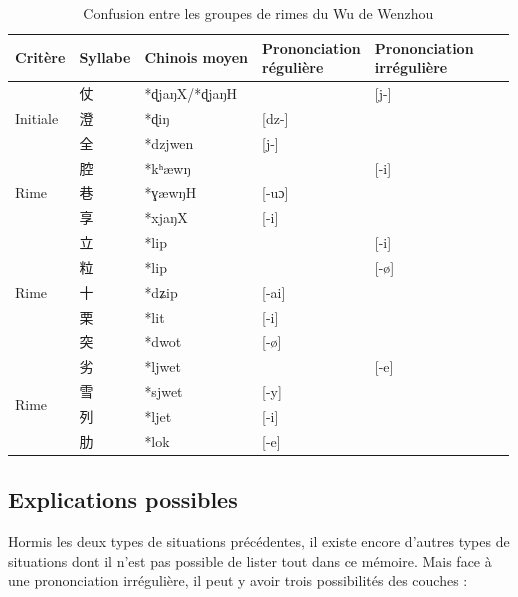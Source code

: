 \documentclass{scrbook}
\newcounter{c}[subsubsection]
\begin{document}
\begin{sloppypar}
\begin{table}[htbp]
\begin{tabular}{lllllll}
    Critère & Syllabe & Chinois moyen  & \makecell{Prononciation\\ régulière} & \makecell{Prononciation\\ irrégulière} \\
    \midrule
    \multirow{3}[2]{*}{Initiale} & \cellcolor[rgb]{ .851,  .851,  .851}仗 & *ɖjaŋX/*ɖjaŋH &       & \multicolumn{1}{l}{[j-]} \\
          & 澄     & *ɖiŋ  & [dz-] &  \\
          & \cellcolor[rgb]{ .851,  .851,  .851}全 & *dzjwen & [j-]  &  \\
    \midrule
    \multirow{3}[2]{*}{Rime} & \cellcolor[rgb]{ .851,  .851,  .851}腔 & *kʰæwŋ &       & \multicolumn{1}{l}{[-i]} \\
          & 巷     & *ɣæwŋH & [-uɔ] &  \\
          & \cellcolor[rgb]{ .851,  .851,  .851}享 & *xjaŋX & [-i]  &  \\
    \midrule
	\multirow{5}[2]{*}{Rime} & \cellcolor[rgb]{ .851,  .851,  .851}立 & *lip  &       & \multicolumn{1}{l}{[-i]} \\
	 & \cellcolor[rgb]{ .851,  .851,  .851}粒 & *lip  &       & \multicolumn{1}{l}{[-ø]} \\          
          & 十     & *dʑip & [-ai] &  \\
          & \cellcolor[rgb]{ .851,  .851,  .851}栗 & *lit  & [-i]  &  \\
          & \cellcolor[rgb]{ .851,  .851,  .851}突 & *dwot & [-ø] &  \\
    \midrule
    \multirow{4}[2]{*}{Rime} & \cellcolor[rgb]{ .851,  .851,  .851}劣 & *ljwet &       & \multicolumn{1}{l}{[-e]} \\
          & 雪     & *sjwet & [-y]  &  \\
          & 列     & *ljet & [-i]  &  \\
          & \cellcolor[rgb]{ .851,  .851,  .851}肋 & *lok  & [-e]  &  \\
    \bottomrule
    \end{tabular}%
  \caption{Confusion entre les groupes de rimes du Wu de Wenzhou}
  \label{tab:exemple_confusion_grp_rime_wenzhou}%
\end{table}%


\subsection{Explications possibles}\label{excep_mot_gram}
Hormis les deux types de situations précédentes, il existe encore d'autres types de situations dont il n'est pas possible de lister tout dans ce mémoire. Mais face à une prononciation irrégulière, il peut y avoir trois possibilités des couches :


\end{sloppypar}
\end{document}
